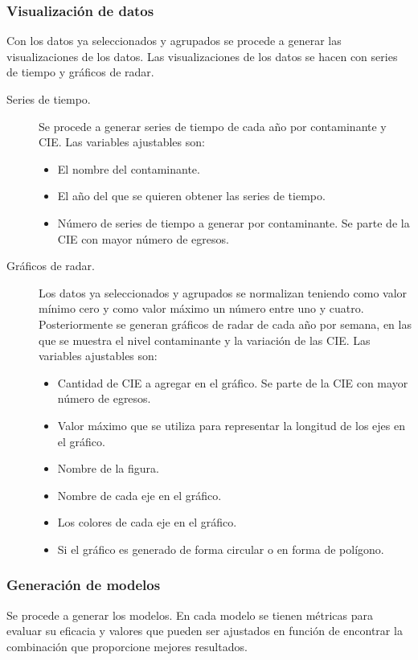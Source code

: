 \documentclass[3p,times]{elsarticle}
\begin{document}
\subsubsection{Visualización de datos}
Con los datos ya seleccionados y agrupados se procede a generar las visualizaciones de los datos. Las visualizaciones de los datos se hacen con series de tiempo y gráficos de radar.

\begin{description}
\item [Series de tiempo.] {Se procede a generar series de tiempo de cada año por contaminante y CIE}. Las variables ajustables son:
\begin{itemize}
	\item El nombre del contaminante.
	\item El año del que se quieren obtener las series de tiempo.
	\item Número de series de tiempo a generar por contaminante. Se parte de la CIE con mayor número de egresos.
\end{itemize}

\item [Gráficos de radar.] {Los datos ya seleccionados y agrupados se normalizan teniendo como valor mínimo cero y como valor máximo un número entre uno y cuatro. Posteriormente se generan gráficos de radar de cada año por semana, en las que se muestra el nivel contaminante y la variación de las CIE}. Las variables ajustables son:
\begin{itemize}
    \item Cantidad de CIE a agregar en el gráfico. Se parte de la CIE con mayor número de egresos.
	\item Valor máximo que se utiliza para representar la longitud de los ejes en el gráfico.
	\item Nombre de la figura.
	\item Nombre de cada eje en el gráfico.
	\item Los colores de cada eje en el gráfico. 
	\item Si el gráfico es generado de forma circular o en forma de polígono.
\end{itemize}
\end{description}

\subsubsection{Generación de modelos}
Se procede a generar los modelos. En cada modelo se tienen métricas para evaluar su eficacia y valores que pueden ser ajustados en función de encontrar la combinación que proporcione mejores resultados.
\end{document}
